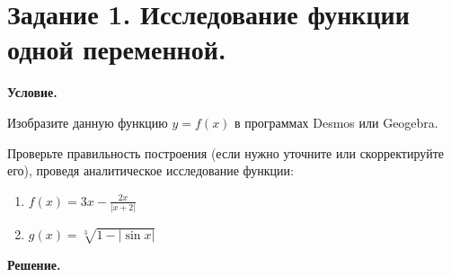 \section{Задание 1. Исследование функции одной переменной.}

\textbf{Условие.}

Изобразите данную функцию $y = f(x)$ в программах Desmos или Geogebra.

Проверьте правильность построения (если нужно уточните или скорректируйте его), проведя аналитическое исследование функции:

\begin{enumerate}
    \item $\displaystyle f(x) = 3x - \frac{2x}{|x + 2|}$
    \item $\displaystyle g(x) = \sqrt[3]{1 - |\sin{x}|}$
\end{enumerate}
\vspace{10mm}
\textbf{Решение.}


